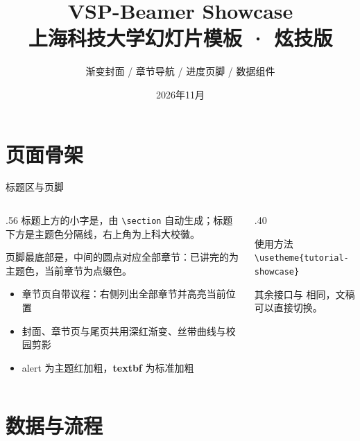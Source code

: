 \documentclass[aspectratio=169,10pt]{beamer}
\title[VSP-Beamer Showcase]{VSP-Beamer Showcase\\上海科技大学幻灯片模板 · 炫技版}
\subtitle{渐变封面 / 章节导航 / 进度页脚 / 数据组件}
\date{2026年11月}
\begin{document}
\VSPtitleframe

\section{页面骨架}

\begin{frame}[t]{标题区与页脚}
\begin{columns}[T,onlytextwidth]
  \begin{column}{.56\textwidth}
    标题上方的小字是，由 \texttt{\textbackslash section} 自动生成；标题下方是主题色分隔线，右上角为上科大校徽。

    页脚最底部是，中间的圆点对应全部章节：已讲完的为主题色，当前章节为点缀色。

    \begin{itemize}
      \item 章节页自带议程：右侧列出全部章节并高亮当前位置
      \item 封面、章节页与尾页共用深红渐变、丝带曲线与校园剪影
      \item \alert{alert} 为主题红加粗，\textbf{textbf} 为标准加粗
    \end{itemize}
  \end{column}
  \begin{column}{.40\textwidth}
    \begin{vspquote}{使用方法}
      \texttt{\textbackslash usetheme\{tutorial-showcase\}}

      其余接口与  相同，文稿可以直接切换。
    \end{vspquote}
      
  \end{column}
\end{columns}
\end{frame}

\section{数据与流程}
\end{document}
